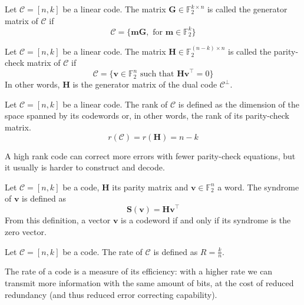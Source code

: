 \begin{definition}
    Let $\mathcal{C} = [n,k]$ be a linear code. The matrix $\mathbf{G} \in \mathds{F}_2^{k\times n}$ is called the generator 
    matrix of $\mathcal{C}$ if
    \begin{equation*}
        \mathcal{C} = \{\mathbf{mG}, \text{ for } \mathbf{m}\in \mathds{F}_2^k\}
    \end{equation*}
\end{definition}

\begin{definition}
    Let $\mathcal{C} = [n,k]$ be a linear code. The matrix $\mathbf{H} \in \mathds{F}_2^{(n-k)\times n}$ is called the 
    parity-check matrix of $\mathcal{C}$ if
    \begin{equation*}
        \mathcal{C} = \{\mathbf{v} \in \mathds{F}_2^n \text{ such that } \mathbf{Hv}^\top = 0\}
    \end{equation*}
    In other words, $\mathbf{H}$ is the generator matrix of the dual code $\mathcal{C}^\perp$.
\end{definition}

\begin{definition}[Rank]
    Let $\mathcal{C} = [n,k]$ be a linear code. The rank of $\mathcal{C}$ is defined as the dimension of the space spanned
    by its codewords or, in other words, the rank of its parity-check matrix.
    \begin{equation*}
        r(\mathcal{C}) = r(\mathbf{H}) = n-k
    \end{equation*}
\end{definition}
A high rank code can correct more errors with fewer parity-check equations, but it usually is harder to construct and decode.

\begin{definition}[Syndrome]
    Let $\mathcal{C} = [n,k]$ be a code, $\mathbf{H}$ its parity matrix and $\mathbf{v} \in \mathds{F}_2^n$ a word. 
    The syndrome of $\mathbf{v}$ is defined as
    \begin{equation*}
        \mathbf{S}(\mathbf{v}) = \mathbf{Hv}^\top
    \end{equation*}
    From this definition,  a vector $\mathbf{v}$ is a codeword if and only if its syndrome is the zero vector.
\end{definition}

\begin{definition}[Rate]
    Let $\mathcal{C} = [n,k]$ be a code. The rate of $\mathcal{C}$ is defined as $R = \frac{k}{n}$.
\end{definition}
The rate of a code is a measure of its efficiency: with a higher rate we can transmit more information with the same amount
of bits, at the cost of reduced redundancy (and thus reduced error correcting capability).

